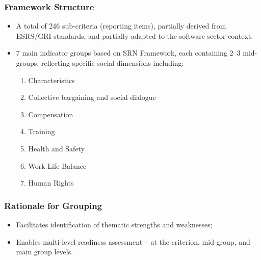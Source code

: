 \subsubsection{Framework Structure}
\begin{itemize}
    \item A total of 246 sub-criteria (reporting items), partially derived from ESRS/GRI standards, and partially adapted to the software sector context.
    \item 7 main indicator groups based on SRN Framework, each containing 2--3 mid-groups, reflecting specific social dimensions including:
    \begin{enumerate}
        \item Characteristics
        \item Collective bargaining and social dialogue
        \item Compensation
        \item Training
        \item Health and Safety
        \item Work Life Balance
        \item Human Rights
    \end{enumerate}
\end{itemize}

\subsubsection{Rationale for Grouping}
\begin{itemize}
    \item Facilitates identification of thematic strengths and weaknesses;
    \item Enables multi-level readiness assessment -- at the criterion, mid-group, and main group levels.
\end{itemize}

